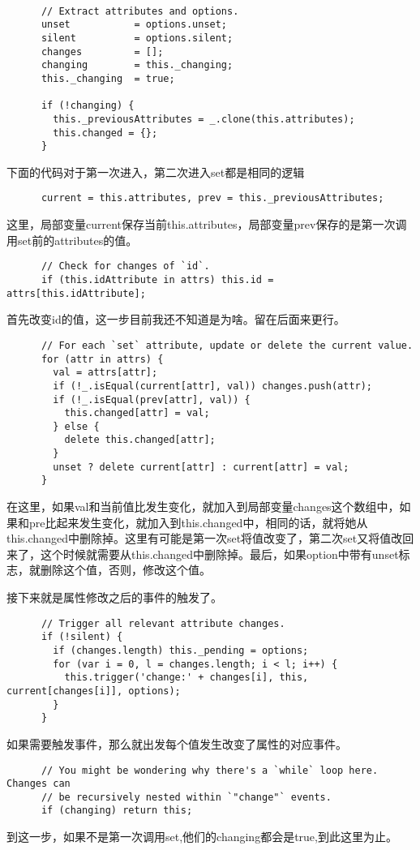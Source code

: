 \documentclass[12pt, oneside, b5paper]{book}
\begin{document}
\begin{CJK}{UTF8}{gkai}
  \begin{lstlisting}

      // Extract attributes and options.
      unset           = options.unset;
      silent          = options.silent;
      changes         = [];
      changing        = this._changing;
      this._changing  = true;

      if (!changing) {
        this._previousAttributes = _.clone(this.attributes);
        this.changed = {};
      }

  \end{lstlisting}
  下面的代码对于第一次进入，第二次进入set都是相同的逻辑
  \begin{lstlisting}
      current = this.attributes, prev = this._previousAttributes;

  \end{lstlisting}
  这里，局部变量current保存当前this.attributes，局部变量prev保存的是第一次调用set前的attributes的值。
  \begin{lstlisting}
      // Check for changes of `id`.
      if (this.idAttribute in attrs) this.id = attrs[this.idAttribute];
  \end{lstlisting}
  首先改变id的值，这一步目前我还不知道是为啥。留在后面来更行。

  \begin{lstlisting}
      // For each `set` attribute, update or delete the current value.
      for (attr in attrs) {
        val = attrs[attr];
        if (!_.isEqual(current[attr], val)) changes.push(attr);
        if (!_.isEqual(prev[attr], val)) {
          this.changed[attr] = val;
        } else {
          delete this.changed[attr];
        }
        unset ? delete current[attr] : current[attr] = val;
      }
  \end{lstlisting}

  在这里，如果val和当前值比发生变化，就加入到局部变量changes这个数组中，如果和pre比起来发生变化，就加入到this.changed中，相同的话，就将她从this.changed中删除掉。这里有可能是第一次set将值改变了，第二次set又将值改回来了，这个时候就需要从this.changed中删除掉。最后，如果option中带有unset标志，就删除这个值，否则，修改这个值。

  接下来就是属性修改之后的事件的触发了。
 
  \begin{lstlisting}
      // Trigger all relevant attribute changes.
      if (!silent) {
        if (changes.length) this._pending = options;
        for (var i = 0, l = changes.length; i < l; i++) {
          this.trigger('change:' + changes[i], this, current[changes[i]], options);
        }
      }
  \end{lstlisting}
  如果需要触发事件，那么就出发每个值发生改变了属性的对应事件。
  \begin{lstlisting}
      // You might be wondering why there's a `while` loop here. Changes can
      // be recursively nested within `"change"` events.
      if (changing) return this;
  \end{lstlisting}
  到这一步，如果不是第一次调用set,他们的changing都会是true,到此这里为止。


\end{CJK}
\end{document}

